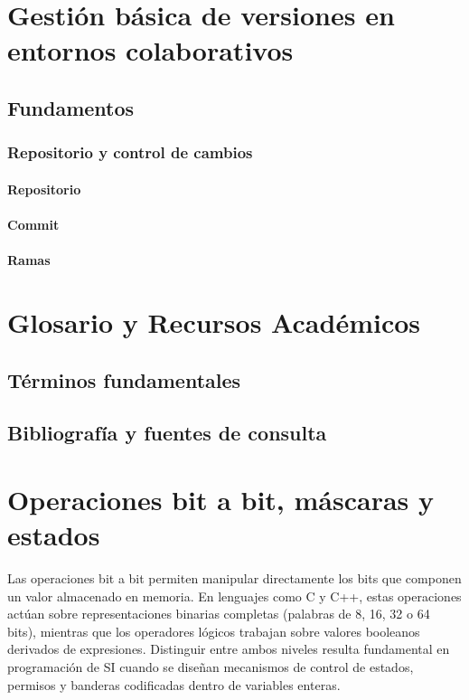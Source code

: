 \documentclass[12pt,twoside]{book}
\begin{document}
	\chapter{Gestión básica de versiones en entornos colaborativos}
	
	\section{Fundamentos}
	
	\subsection{Repositorio y control de cambios}
	
	\subsubsection{Repositorio}
	
	\subsubsection{Commit}
	
	\subsubsection{Ramas}
	
	\chapter{Glosario y Recursos Académicos}
	
	\section{Términos fundamentales}
	
	\section{Bibliografía y fuentes de consulta}
	
	\appendix
	\chapter{Operaciones bit a bit, máscaras y estados}		
		Las operaciones bit a bit permiten manipular directamente los bits que componen un valor almacenado en memoria. En lenguajes como C y C++, estas operaciones actúan sobre representaciones binarias completas (palabras de 8, 16, 32 o 64 bits), mientras que los operadores lógicos trabajan sobre valores booleanos derivados de expresiones. Distinguir entre ambos niveles resulta fundamental en programación de SI cuando se diseñan mecanismos de control de estados, permisos y banderas codificadas dentro de variables enteras.
		
\end{document}
